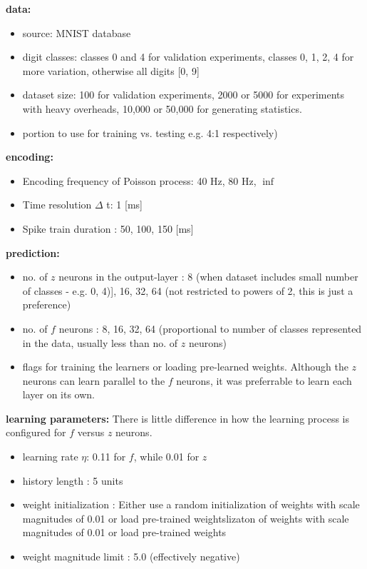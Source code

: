 \documentclass{report}
\begin{document}
\textbf{data:}
\begin{itemize}
	\item source: MNIST database \cite{LeCun1998}
	\item	digit classes: classes 0 and 4 for validation experiments, classes 0, 1, 2, 4 for more variation, otherwise all digits [0, 9]
	\item	dataset size: 100 for validation experiments, 2000 or 5000 for experiments with heavy overheads, 10,000 or 50,000 for generating statistics.
  \item portion to use for training vs. testing e.g. 4:1 respectively)
\end{itemize}

\textbf{encoding:}
\begin{itemize}
	\item Encoding frequency of Poisson process: 40 Hz, 80 Hz, $\inf$
	\item Time resolution $\Delta$ t: 1 [ms]
	\item Spike train duration : 50, 100, 150 [ms]
\end{itemize}
    
\textbf{prediction:}
\begin{itemize}
	\item no. of $z$ neurons in the output-layer : 8 (when dataset includes small number of classes - e.g. 0, 4)], 16, 32, 64 (not restricted to powers of 2, this is just a preference)
	\item no. of $f$ neurons : 8, 16, 32, 64 (proportional to number of classes represented in the data, usually less than no. of $z$ neurons)
	\item flags for training the learners or loading pre-learned weights. Although the $z$ neurons can learn parallel to the $f$ neurons, it was preferrable to learn each layer on its own.
\end{itemize}    
    
\textbf{learning parameters:}
There is little difference in how the learning process is configured for $f$ versus $z$ neurons.
\begin{itemize} 
	\item learning rate $\eta$: 0.11 for $f$, while 0.01 for $z$
	\item history length : 5 units
	\item weight initialization : Either use a random initialization of weights with scale magnitudes of 0.01 or load pre-trained weightslizaton of weights with scale magnitudes of 0.01 or load pre-trained weights
	\item weight magnitude limit : 5.0 (effectively negative)
\end{itemize}
\end{document}
